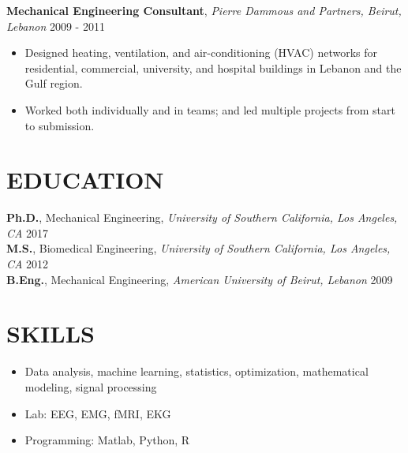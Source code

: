 \documentclass[11pt]{res-modified}
\begin{document}
\begin{resume}
{\bf Mechanical Engineering Consultant}, \textit{Pierre Dammous and Partners, Beirut, Lebanon} \hfill 2009 - 2011
\begin{itemize}
\item Designed heating, ventilation, and air-conditioning (HVAC) networks for residential, commercial, university, and hospital buildings in Lebanon and the Gulf region.
\item Worked both individually and in teams; and led multiple projects from start to submission.
\end{itemize}


\section{EDUCATION}
\vspace{1mm}
\textbf{Ph.D.}, Mechanical Engineering, \textit{University of Southern California, Los Angeles, CA}  \hfill 2017\\
\textbf{M.S.}, Biomedical Engineering, \textit{University of Southern California, Los Angeles, CA} \hfill 2012\\
\textbf{B.Eng.}, Mechanical Engineering, \textit{American University of Beirut, Lebanon} \hfill 2009


\section{SKILLS}
\vspace{5mm}
\begin{itemize}
\item Data analysis, machine learning, statistics, optimization, mathematical modeling, signal processing
\item Lab: EEG, EMG, fMRI, EKG
\item Programming: Matlab, Python, R
\end{itemize}


\end{resume}
\end{document}

